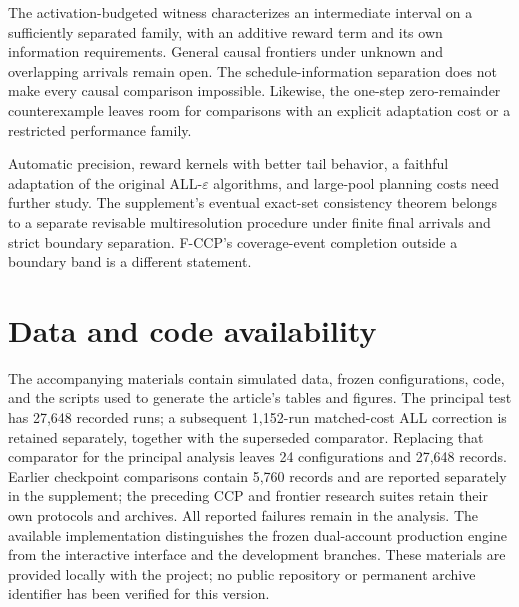 \documentclass[11pt]{article}
\theoremstyle{remark}
\begin{document}
The activation-budgeted witness characterizes an intermediate interval
on a sufficiently separated family, with an additive reward term and
its own information requirements. General causal frontiers under
unknown and overlapping arrivals remain open. The schedule-information
separation does not make every causal comparison impossible. Likewise,
the one-step zero-remainder counterexample leaves room for comparisons
with an explicit adaptation cost or a restricted performance family.

Automatic precision, reward kernels with better tail behavior, a faithful
adaptation of the original ALL-$\varepsilon$ algorithms, and large-pool
planning costs need further study. The supplement's eventual exact-set
consistency theorem belongs to a separate revisable multiresolution
procedure under finite final arrivals and strict boundary separation.
F-CCP's coverage-event completion outside a boundary band is a different
statement.

\section*{Data and code availability}
The accompanying materials contain simulated data, frozen configurations,
code, and the scripts used to generate the article's tables and figures.
The principal test has 27,648 recorded runs; a subsequent 1,152-run
matched-cost ALL correction is retained separately, together with the
superseded comparator. Replacing that comparator for the principal
analysis leaves 24 configurations and 27,648 records. Earlier checkpoint
comparisons contain 5,760 records and are reported separately in the
supplement; the preceding CCP and frontier research suites retain their
own protocols and archives. All reported failures remain in the analysis.
The available implementation distinguishes the frozen dual-account
production engine from the interactive interface and the development
branches. These materials are provided locally with the project; no
public repository or permanent archive identifier has been verified for
this version.



\end{document}
